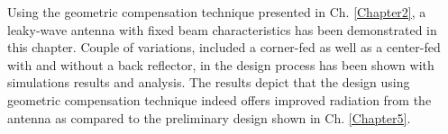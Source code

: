 Using the geometric compensation technique presented in Ch. \ref{Chapter2}, a leaky-wave antenna with fixed beam characteristics has been demonstrated in this chapter. Couple of variations, included a corner-fed as well as a center-fed with and without a back reflector, in the design process has been shown with simulations results and analysis. The results depict that the design using geometric compensation technique indeed offers improved radiation from the antenna as compared to the preliminary design shown in Ch. \ref{Chapter5}. 
